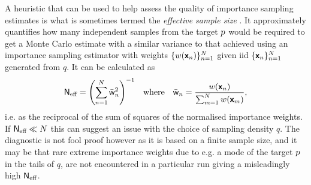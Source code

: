 A heuristic that can be used to help assess the quality of importance sampling estimates is what is sometimes termed the \emph{effective sample size} \citep{kong1992note,owen2013importance}. It approximately quantifies how many independent samples from the target $p$ would be required to get a Monte Carlo estimate with a similar variance to that achieved using an importance sampling estimator with weights $\lbrace w(\boldsymbol{\mathsf{x}}_n) \rbrace_{n=1}^N$ given \ac{iid} $\lbrace \boldsymbol{\mathsf{x}}_n\rbrace_{n=1}^N$ generated from $q$. It can be calculated as
\begin{equation}\label{eq:is-effective-sample-size}
  \rvar{N}_{\textrm{eff}} = 
  \lpa \sum_{n=1}^N \bar{\rvar{w}}_n^2 \rpa^{-1}
  \quad\textrm{where}\quad \bar{\rvar{w}}_n  = \frac{w\lpa\rvct{x}_n\rpa}{\sum_{m=1}^N w\lpa\rvct{x}_m\rpa},
\end{equation}
i.e. as the reciprocal of the sum of squares of the normalised importance weights. If $\mathsf{N}_{\textrm{eff}} \ll N$ this can suggest an issue with the choice of sampling density $q$. The diagnostic is not fool proof however as it is based on a finite sample size, and it may be that rare extreme importance weights due to e.g. a mode of the target $p$ in the tails of $q$, are not encountered in a particular run giving a misleadingly high $\mathsf{N}_{\textrm{eff}}$.

